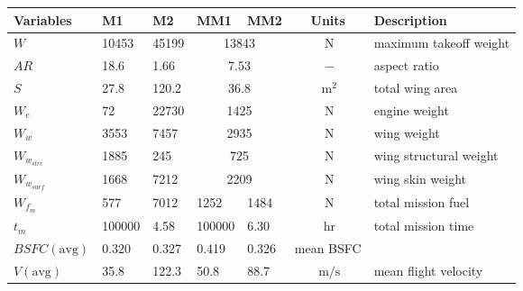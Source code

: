 \begin{footnotesize}
\begin{longtable}{lllllcl}
\toprule
Variables & M1 & M2 & MM1 & MM2 & Units & Description \\
\midrule
$W$ & 10453 & 45199 & \multicolumn{2}{c}{13843} & $~\mathrm{N}$ & maximum takeoff weight \\
$AR$ & 18.6 & 1.66 & \multicolumn{2}{c}{7.53} & $~\mathrm{-}$ & aspect ratio \\
$S$ & 27.8 & 120.2 & \multicolumn{2}{c}{36.8} & $~\mathrm{m^{2}}$ & total wing area \\
$W_e$ & 72 & 22730 & \multicolumn{2}{c}{1425} & $~\mathrm{N}$ & engine weight\\
$W_w$ & 3553 & 7457 & \multicolumn{2}{c}{2935} & $~\mathrm{N}$ & wing weight \\
$W_{w_{strc}}$ & 1885 & 245 & \multicolumn{2}{c}{725} & $~\mathrm{N}$ & wing structural weight\\
$W_{w_{surf}}$ & 1668 & 7212 & \multicolumn{2}{c}{2209} & $~\mathrm{N}$ & wing skin weight \\
$W_{f_m}$ & 577 & 7012 & 1252 & 1484 & $~\mathrm{N}$ & total mission fuel \\
$t_m$ & 100000 & 4.58 & 100000 & 6.30 & $~\mathrm{hr}$ & total mission time\\
$BSFC \mathrm{(avg)}$ & 0.320 & 0.327 & 0.419 & 0.326 & mean BSFC \\
$V \mathrm{(avg)}$ & 35.8 & 122.3 & 50.8 & 88.7 & $~\mathrm{m/s}$ & mean flight velocity \\
\bottomrule
\end{longtable}
\end{footnotesize}
